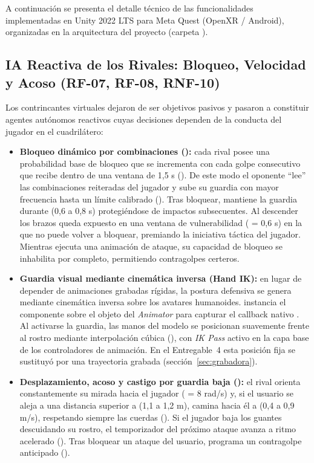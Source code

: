 A continuación se presenta el detalle técnico de las funcionalidades implementadas en Unity 2022 LTS para Meta Quest (OpenXR / Android), organizadas en la arquitectura del proyecto (carpeta ).

\subsection{IA Reactiva de los Rivales: Bloqueo, Velocidad y Acoso (RF-07, RF-08, RNF-10)}
Los contrincantes virtuales dejaron de ser objetivos pasivos y pasaron a constituir agentes autónomos reactivos cuyas decisiones dependen de la conducta del jugador en el cuadrilátero:
\begin{itemize}
  \item \textbf{Bloqueo dinámico por combinaciones ():} cada rival posee una probabilidad base de bloqueo que se incrementa con cada golpe consecutivo que recibe dentro de una ventana de 1,5 s (). De este modo el oponente ``lee'' las combinaciones reiteradas del jugador y sube su guardia con mayor frecuencia hasta un límite calibrado (). Tras bloquear, mantiene la guardia durante  (0,6 a 0,8 s) protegiéndose de impactos subsecuentes. Al descender los brazos queda expuesto en una ventana de vulnerabilidad ( = 0,6 s) en la que no puede volver a bloquear, premiando la iniciativa táctica del jugador. Mientras ejecuta una animación de ataque, su capacidad de bloqueo se inhabilita por completo, permitiendo contragolpes certeros.
  \item \textbf{Guardia visual mediante cinemática inversa (Hand IK):} en lugar de depender de animaciones grabadas rígidas, la postura defensiva se genera mediante cinemática inversa sobre los avatares humanoides.  instancia el componente  sobre el objeto del \emph{Animator} para capturar el callback nativo . Al activarse la guardia, las manos del modelo se posicionan suavemente frente al rostro mediante interpolación cúbica (), con \emph{IK Pass} activo en la capa base de los controladores de animación. En el Entregable~4 esta posición fija se sustituyó por una trayectoria grabada (sección~\ref{sec:grabadora}).
  \item \textbf{Desplazamiento, acoso y castigo por guardia baja ():} el rival orienta constantemente su mirada hacia el jugador ( = 8 rad/s) y, si el usuario se aleja a una distancia superior a  (1,1 a 1,2 m), camina hacia él a  (0,4 a 0,9 m/s), respetando siempre las cuerdas (). Si el jugador baja los guantes descuidando su rostro, el temporizador del próximo ataque avanza a ritmo acelerado (). Tras bloquear un ataque del usuario, programa un contragolpe anticipado ().

\end{itemize}
